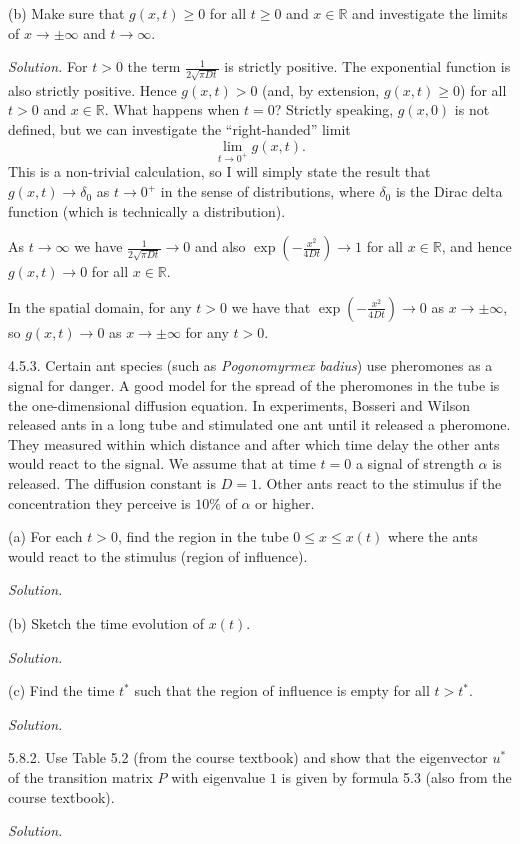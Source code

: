 \documentclass{article}
\newcommand{\R}{\mathbb{R}}
\begin{document}
(b) Make sure that $g(x, t) \geq 0$ for all $t \geq 0$ and $x \in \R$ and
investigate the limits of $x \to \pm \infty$ and $t \to \infty$.

\textit{Solution.}
For $t > 0$ the term $\frac{1}{2 \sqrt{\pi D t}}$ is strictly positive.
The exponential function is also strictly positive. Hence $g(x, t) > 0$
(and, by extension, $g(x, t) \geq 0$) for all $t > 0$ and $x \in \R$.
What happens when $t = 0$? Strictly speaking, $g(x, 0)$ is not defined,
but we can investigate the ``right-handed'' limit
%
\begin{equation*}
    \lim_{t \to 0^+} g(x, t)
    .
\end{equation*}
%
This is a non-trivial calculation, so I will simply state the result
that $g(x, t) \to \delta_0$ as $t \to 0^+$ in the sense of distributions,
where $\delta_0$ is the Dirac delta function (which is technically a
distribution).

As $t \to \infty$ we have $\frac{1}{2 \sqrt{\pi D t}} \to 0$ and also
$\exp ( - \frac{x^2}{4 D t} ) \to 1$ for all $x \in \R$, and
hence $g(x, t) \to 0$ for all $x \in \R$.

In the spatial domain, for any $t > 0$ we have that
$\exp ( - \frac{x^2}{4 D t} ) \to 0$ as $x \to \pm \infty$, so
$g(x, t) \to 0$ as $x \to \pm \infty$ for any $t > 0$.


\newpage

4.5.3. Certain ant species (such as \textit{Pogonomyrmex badius}) use
pheromones as a signal for danger. A good model for the spread of the
pheromones in the tube is the one-dimensional diffusion equation. In
experiments, Bosseri and Wilson released ants in a long tube and stimulated
one ant until it released a pheromone. They measured within which distance
and after which time delay the other ants would react to the signal.
We assume that at time $t = 0$ a signal of strength $\alpha$ is released.
The diffusion constant is $D = 1$. Other ants react to the stimulus if the
concentration they perceive is $10\%$ of $\alpha$ or higher.

(a) For each $t > 0$, find the region in the tube $0 \leq x \leq x(t)$ where
the ants would react to the stimulus (region of influence).

\textit{Solution.}

\vspace{5mm}

(b) Sketch the time evolution of $x(t)$.

\textit{Solution.}

\vspace{5mm}

(c) Find the time $t^*$ such that the region of influence is empty for all
$t > t^*$.

\textit{Solution.}

\newpage

5.8.2. Use Table 5.2 (from the course textbook) and show that the eigenvector
$u^*$ of the transition matrix $P$ with eigenvalue $1$ is given by formula 5.3
(also from the course textbook).

\textit{Solution.}
\end{document}
